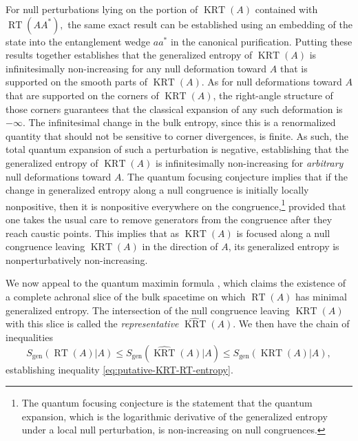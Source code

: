 \documentclass[a4paper,11pt]{article}
\newcommand{\RT}{\operatorname{RT}}
\newcommand{\KRT}{\operatorname{KRT}}
\begin{document}
For null perturbations lying on the portion of $\KRT(A)$ contained with $\RT(AA^*),$ the same exact result can be established using an embedding of the state into the entanglement wedge $aa^*$ in the canonical purification. Putting these results together establishes that the generalized entropy of $\KRT(A)$ is infinitesimally non-increasing for any null deformation toward $A$ that is supported on the smooth parts of $\KRT(A)$. As for null deformations toward $A$ that are supported on the corners of $\KRT(A)$, the right-angle structure of those corners guarantees that the classical expansion of any such deformation is $-\infty.$ The infinitesimal change in the bulk entropy, since this is a renormalized quantity that should not be sensitive to corner divergences, is finite. As such, the total quantum expansion of such a perturbation is negative, establishing that the generalized entropy of $\KRT(A)$ is infinitesimally non-increasing for \emph{arbitrary} null deformations toward $A$. The quantum focusing conjecture \cite{bousso2016quantum} implies that if the change in generalized entropy along a null congruence is initially locally nonpositive, then it is nonpositive everywhere on the congruence,\footnote{The quantum focusing conjecture is the statement that the quantum expansion, which is the logarithmic derivative of the generalized entropy under a local null perturbation, is non-increasing on null congruences.} provided that one takes the usual care to remove generators from the congruence after they reach caustic points. This implies that as $\KRT(A)$ is focused along a null congruence leaving $\KRT(A)$ in the direction of $A$, its generalized entropy is nonperturbatively non-increasing.

We now appeal to the quantum maximin formula \cite{quantum-maximin}, which claims the existence of a complete achronal slice of the bulk spacetime on which $\RT(A)$ has minimal generalized entropy. The intersection of the null congruence leaving $\KRT(A)$ with this slice is called the \emph{representative} $\widehat{\KRT}(A).$ We then have the chain of inequalities
\begin{equation}
	S_{\text{gen}}(\RT(A)|A) \leq S_{\text{gen}}(\widehat{\KRT}(A)|A) \leq S_{\text{gen}}(\KRT(A)|A),
\end{equation}
establishing inequality \eqref{eq:putative-KRT-RT-entropy}.




\end{document}

